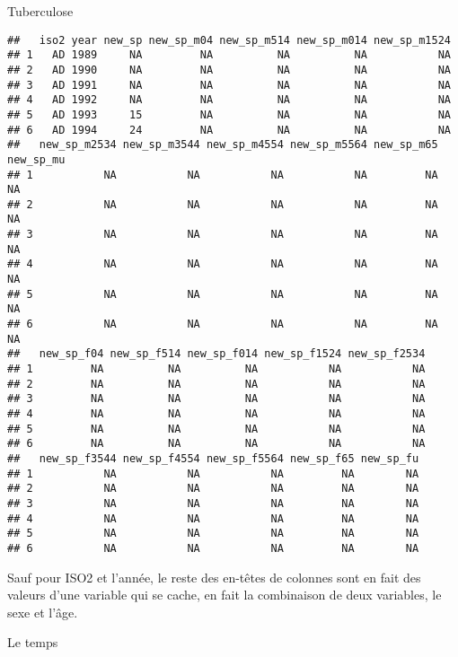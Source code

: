 \documentclass[]{article}
\begin{document}
Tuberculose

\begin{verbatim}
##   iso2 year new_sp new_sp_m04 new_sp_m514 new_sp_m014 new_sp_m1524
## 1   AD 1989     NA         NA          NA          NA           NA
## 2   AD 1990     NA         NA          NA          NA           NA
## 3   AD 1991     NA         NA          NA          NA           NA
## 4   AD 1992     NA         NA          NA          NA           NA
## 5   AD 1993     15         NA          NA          NA           NA
## 6   AD 1994     24         NA          NA          NA           NA
##   new_sp_m2534 new_sp_m3544 new_sp_m4554 new_sp_m5564 new_sp_m65 new_sp_mu
## 1           NA           NA           NA           NA         NA        NA
## 2           NA           NA           NA           NA         NA        NA
## 3           NA           NA           NA           NA         NA        NA
## 4           NA           NA           NA           NA         NA        NA
## 5           NA           NA           NA           NA         NA        NA
## 6           NA           NA           NA           NA         NA        NA
##   new_sp_f04 new_sp_f514 new_sp_f014 new_sp_f1524 new_sp_f2534
## 1         NA          NA          NA           NA           NA
## 2         NA          NA          NA           NA           NA
## 3         NA          NA          NA           NA           NA
## 4         NA          NA          NA           NA           NA
## 5         NA          NA          NA           NA           NA
## 6         NA          NA          NA           NA           NA
##   new_sp_f3544 new_sp_f4554 new_sp_f5564 new_sp_f65 new_sp_fu
## 1           NA           NA           NA         NA        NA
## 2           NA           NA           NA         NA        NA
## 3           NA           NA           NA         NA        NA
## 4           NA           NA           NA         NA        NA
## 5           NA           NA           NA         NA        NA
## 6           NA           NA           NA         NA        NA
\end{verbatim}

Sauf pour ISO2 et l'année, le reste des en-têtes de colonnes sont en
fait des valeurs d'une variable qui se cache, en fait la combinaison de
deux variables, le sexe et l'âge.

Le temps
\end{document}
